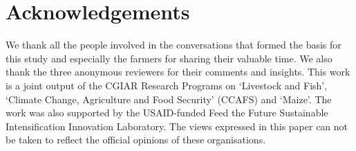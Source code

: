 \section{Acknowledgements}

We thank all the people involved in the conversations that formed the basis for this study and especially the farmers for sharing their valuable time. We also thank the three anonymous reviewers for their comments and insights. This work is a joint output of the CGIAR Research Programs on `Livestock and Fish', `Climate Change, Agriculture and Food Security' (CCAFS) and `Maize'. The work was also supported by the USAID-funded Feed the Future Sustainable Intensification Innovation Laboratory. The views expressed in this paper can not be taken to reflect the official opinions of these organisations.
